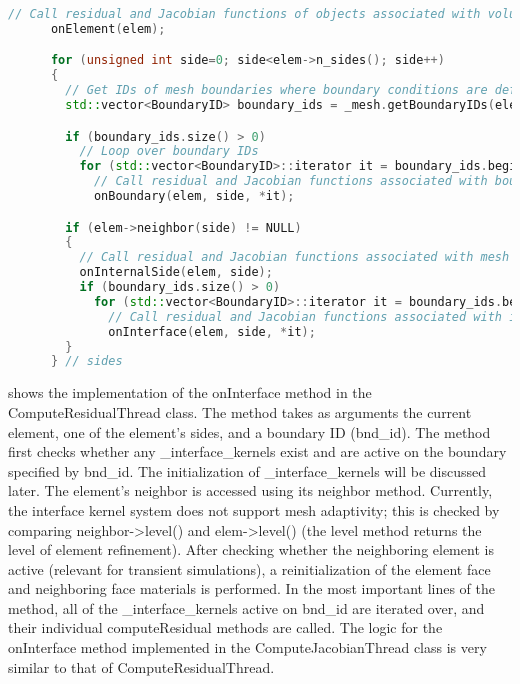 \begin{lstlisting}[language = C++, caption = Snapshot of different geometric object calls in ThreadedElementLoopBase::operator, label = code:ThreadedElementLoopBase]
      // Call residual and Jacobian functions of objects associated with volumetric elements. These are Kernel objects
      onElement(elem);

      for (unsigned int side=0; side<elem->n_sides(); side++)
      {
        // Get IDs of mesh boundaries where boundary conditions are defined
        std::vector<BoundaryID> boundary_ids = _mesh.getBoundaryIDs(elem, side);

        if (boundary_ids.size() > 0)
          // Loop over boundary IDs
          for (std::vector<BoundaryID>::iterator it = boundary_ids.begin(); it != boundary_ids.end(); ++it)
            // Call residual and Jacobian functions associated with boundaries. These are IntegratedBC objects
            onBoundary(elem, side, *it);

        if (elem->neighbor(side) != NULL)
        {
          // Call residual and Jacobian functions associated with mesh internal sides. These are DGKernel objects
          onInternalSide(elem, side);
          if (boundary_ids.size() > 0)
            for (std::vector<BoundaryID>::iterator it = boundary_ids.begin(); it != boundary_ids.end(); ++it)
              // Call residual and Jacobian functions associated with interfaces between subdomains. These are the newly implemented InterfaceKernel objects
              onInterface(elem, side, *it);
        }
      } // sides
\end{lstlisting}

 shows the implementation of the onInterface method in the ComputeResidualThread class. The method takes as arguments the current element, one of the element's sides, and a boundary ID (bnd\_id). The method first checks whether any \_interface\_kernels exist and are active on the boundary specified by bnd\_id. The initialization of \_interface\_kernels will be discussed later. The element's neighbor is accessed using its neighbor method. Currently, the interface kernel system does not support mesh adaptivity; this is checked by comparing neighbor->level() and elem->level() (the level method returns the level of element refinement). After checking whether the neighboring element is active (relevant for transient simulations), a reinitialization of the element face and neighboring face materials is performed. In the most important lines of the method, all of the \_interface\_kernels active on bnd\_id are iterated over, and their individual computeResidual methods are called. The logic for the onInterface method implemented in the ComputeJacobianThread class is very similar to that of ComputeResidualThread.

